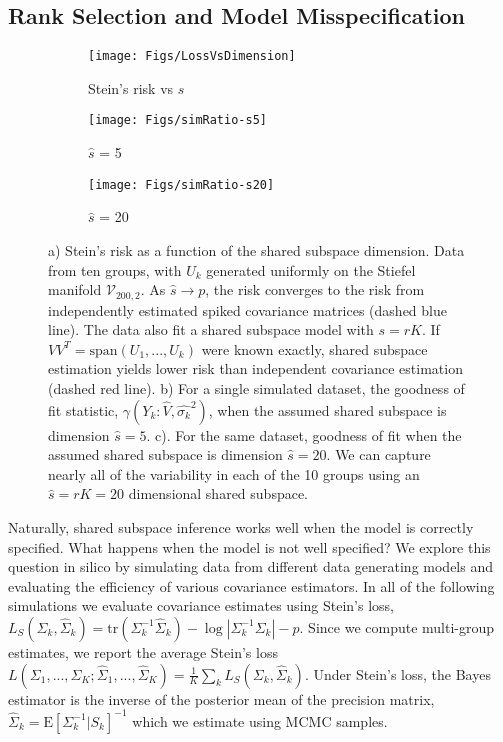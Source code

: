 \documentclass[12pt]{article}
\newcommand{\Exp}[1]{{\text{E}}[ \ensuremath{ #1 } ]  }
\begin{document}
\subsection{Rank Selection and Model Misspecification}

\begin{figure}[t]
    \centering
    \begin{subfigure}[b]{0.3\textwidth}
        \texttt{[image: Figs/LossVsDimension]}
        \caption{Stein's risk vs $\hat{s}$}
        \label{fig:sdimension}
    \end{subfigure}
    \begin{subfigure}[b]{0.3\textwidth}
        \texttt{[image: Figs/simRatio-s5]}
        \caption{$\hat{s}$ = 5}
        \label{fig:ratio-s5}
    \end{subfigure}
    \begin{subfigure}[b]{0.3\textwidth}
        \texttt{[image: Figs/simRatio-s20]}
        \caption{$\hat{s}$ = 20}
        \label{fig:ratio-s20}
    \end{subfigure}
    \caption{a) Stein's risk as a function of the
      shared subspace dimension.  Data from ten groups, with $U_k$
      generated uniformly on the Stiefel manifold
      $\mathcal{V}_{200, 2}$.  As $\hat{s} \rightarrow p$, the risk converges to the
      risk from independently estimated spiked covariance matrices
      (dashed blue line).  The data also fit a shared subspace model
      with $s=rK$.  If $VV^T = \text{span}(U_1, ..., U_k)$ were known
      exactly, shared subspace estimation yields lower risk than
      independent covariance estimation (dashed red line).  b) For a
      single simulated dataset, the goodness of fit statistic,
      $\gamma(Y_k: \hat{V}, \hat{\sigma_k}^2)$, when the assumed
      shared subspace is dimension $\hat{s} = 5$.  c).  For the same
      dataset, goodness of fit when the assumed shared subspace is
      dimension $\hat{s} = 20$.  We can capture nearly all of the
      variability in each of the 10 groups using an $\hat{s}=rK=20$
      dimensional shared subspace. }
\label{fig:dimensionPlots}
\end{figure}

Naturally, shared subspace inference works well when the model is
correctly specified.  What happens when the model is not well
specified?  We explore this question in silico by simulating data from
different data generating models and evaluating the efficiency of
various covariance estimators.  In all of the following simulations we
evaluate covariance estimates using Stein's loss,
$L_S( \Sigma_k , \hat\Sigma_k) = \text{tr}( \Sigma_k^{-1} \hat
\Sigma_k ) - \log |\Sigma_k^{-1} \Sigma_k | - p$.
Since we compute multi-group estimates, we report the
average Stein's loss
$L(\Sigma_1, ..., \Sigma_K; \hat\Sigma_1, ..., \hat\Sigma_K ) =
\frac{1}{K} \sum_k L_S( \Sigma_k , \hat\Sigma_k)$.
Under Stein's loss, the Bayes estimator is the inverse of
the posterior mean of the precision matrix,
$\hat \Sigma_{k} = \Exp{ \Sigma_k^{-1} | S_k}^{-1}$ which we
estimate using MCMC samples.
\end{document}
